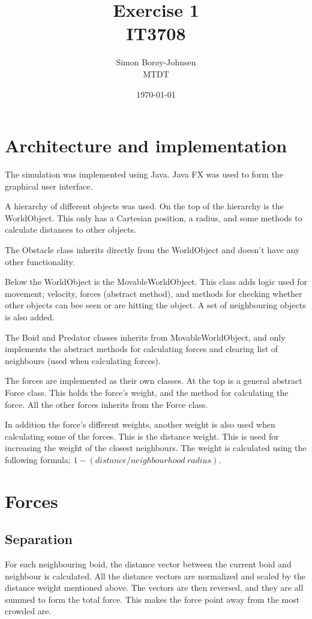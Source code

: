 \documentclass{article}
\begin{document}
\title{\textbf{Exercise 1} \\ IT3708}
\author{Simon Borøy-Johnsen \\ MTDT}
\date{\today}
\maketitle


\section{Architecture and implementation}
The simulation was implemented using Java. Java FX was used to form the graphical user interface.

A hierarchy of different objects was used. On the top of the hierarchy is the WorldObject. This only has a Cartesian position, a radius, and some methods to calculate distances to other objects.

The Obstacle class inherits directly from the WorldObject and doesn't have any other functionality.

Below the WorldObject is the MovableWorldObject. This class adds logic used for movement; velocity, forces (abstract method), and methods for checking whether other objects can bee seen or are hitting the object. A set of neighbouring objects is also added.

The Boid and Predator classes inherits from MovableWorldObject, and only implements the abstract methods for calculating forces and clearing list of neighbours (used when calculating forces).

The forces are implemented as their own classes. At the top is a general abstract Force class. This holds the force's weight, and the method for calculating the force. All the other forces inherits from the Force class.

In addition the force's different weights, another weight is also used when calculating some of the forces. This is the distance weight. This is used for increasing the weight of the closest neighbours. The weight is calculated using the following formula; $1-(distance / neighbourhood\ radius)$.

\section{Forces}
\subsection{Separation}
For each neighbouring boid, the distance vector between the current boid and neighbour is calculated. All the distance vectors are normalized and scaled by the distance weight mentioned above. The vectors are then reversed, and they are all summed to form the total force. This makes the force point away from the most crowded are.
\end{document}
